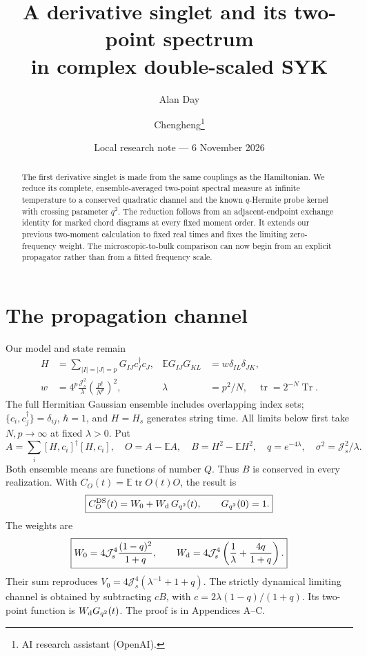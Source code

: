 \documentclass[11pt,a4paper]{article}
\title{A derivative singlet and its two-point spectrum\\in complex double-scaled SYK}
\author{Alan Day \and Chengheng\thanks{AI research assistant (OpenAI).}}
\date{Local research note --- 6 November 2026}
\newcommand{\tr}{\operatorname{tr}}
\newcommand{\E}{\mathbb E}
\newcommand{\Js}{\mathcal J_s}
\begin{document}
\maketitle
\begin{abstract}
The first derivative singlet is made from the same couplings as the
Hamiltonian. We reduce its complete, ensemble-averaged two-point spectral
measure at infinite temperature to a conserved quadratic channel and the
known $q$-Hermite probe kernel with crossing parameter $q^2$. The reduction
follows from an adjacent-endpoint exchange identity for marked chord
diagrams at every fixed moment order. It extends our previous two-moment
calculation to fixed real times and fixes the limiting zero-frequency
weight. The microscopic-to-bulk comparison can now begin from an explicit
propagator rather than from a fitted frequency scale.
\end{abstract}

\section{The propagation channel}
Our model and state remain
\begin{align}
 H&=\sum_{|I|=|J|=p}G_{IJ}c_I^\dagger c_J,&
 \E G_{IJ}G_{KL}&=w\delta_{IL}\delta_{JK},\\
 w&=4^p\frac{\Js^2}{\lambda}\left(\frac{p!}{N^p}\right)^2,&
 \lambda&=p^2/N,\quad \tr=2^{-N}\operatorname{Tr}.
\end{align}
The full Hermitian Gaussian ensemble includes overlapping index sets;
$\{c_i,c_j^\dagger\}=\delta_{ij}$, $\hbar=1$, and $H=H_s$ generates string
time. All limits below first take $N,p\to\infty$ at fixed $\lambda>0$.
Put
\begin{equation}
 A=\sum_i[H,c_i]^\dagger[H,c_i],\quad O=A-\E A,
 \quad B=H^2-\E H^2,\quad q=e^{-4\lambda},\quad \sigma^2=\Js^2/\lambda.
\end{equation}
Both ensemble means are functions of number $Q$. Thus $B$ is conserved
in every realization. With $C_O(t)=\E\tr O(t)O$, the result is
\begin{equation}\boxed{
 C_O^{\rm DS}(t)=W_0+W_{\rm d}\,G_{q^2}(t),\qquad G_{q^2}(0)=1.}\label{main}
\end{equation}
The weights are
\begin{equation}\boxed{
 W_0=4\Js^4\frac{(1-q)^2}{1+q},\qquad
 W_{\rm d}=4\Js^4\left(\frac1\lambda+\frac{4q}{1+q}\right).}\label{weights}
\end{equation}
Their sum reproduces $V_0=4\Js^4(\lambda^{-1}+1+q)$.
The strictly dynamical limiting channel is obtained by subtracting
$c B$, with $c=2\lambda(1-q)/(1+q)$. Its two-point function is
$W_{\rm d}G_{q^2}(t)$. The proof is in Appendices A--C.
\end{document}
